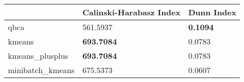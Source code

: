 \begin{table}[htbp]
\centering
\begin{tabular}{lll}
\toprule
 & Calinski-Harabasz Index & Dunn Index \\
\midrule
qbca & 561.5937 & \textbf{0.1094} \\
kmeans & \textbf{693.7084} & 0.0783 \\
kmeans_plusplus & \textbf{693.7084} & 0.0783 \\
minibatch_kmeans & 675.5373 & 0.0607 \\
\bottomrule
\end{tabular}
\end{table}
